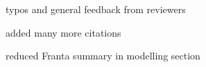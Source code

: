 typos and general feedback from reviewers

added many more citations

reduced Franta summary in modelling section